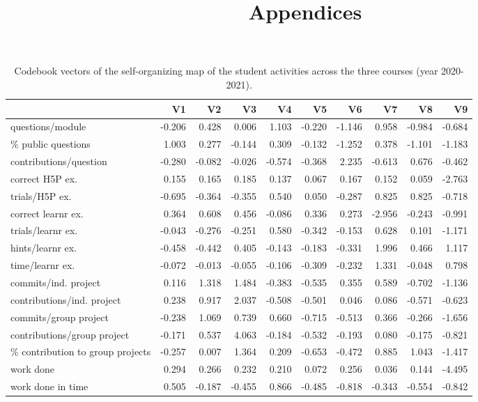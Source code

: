 \documentclass[
]{article}
\title{Appendices}
\author{}
\date{\vspace{-2.5em}}
\begin{document}
\maketitle

\begin{landscape}\begin{table}

\caption{\label{tab:somtab1}\label{tab:tab_som} Codebook vectors of the self-organizing map of the student activities across the three courses (year 2020-2021).}
\centering
\begin{tabular}[t]{l|r|r|r|r|r|r|r|r|r}
\hline
  & V1 & V2 & V3 & V4 & V5 & V6 & V7 & V8 & V9\\
\hline
questions/module & -0.206 & 0.428 & 0.006 & 1.103 & -0.220 & -1.146 & 0.958 & -0.984 & -0.684\\
\hline
\% public questions & 1.003 & 0.277 & -0.144 & 0.309 & -0.132 & -1.252 & 0.378 & -1.101 & -1.183\\
\hline
contributions/question & -0.280 & -0.082 & -0.026 & -0.574 & -0.368 & 2.235 & -0.613 & 0.676 & -0.462\\
\hline
correct H5P ex. & 0.155 & 0.165 & 0.185 & 0.137 & 0.067 & 0.167 & 0.152 & 0.059 & -2.763\\
\hline
trials/H5P ex. & -0.695 & -0.364 & -0.355 & 0.540 & 0.050 & -0.287 & 0.825 & 0.825 & -0.718\\
\hline
correct learnr ex. & 0.364 & 0.608 & 0.456 & -0.086 & 0.336 & 0.273 & -2.956 & -0.243 & -0.991\\
\hline
trials/learnr ex. & -0.043 & -0.276 & -0.251 & 0.580 & -0.342 & -0.153 & 0.628 & 0.101 & -1.171\\
\hline
hints/learnr ex. & -0.458 & -0.442 & 0.405 & -0.143 & -0.183 & -0.331 & 1.996 & 0.466 & 1.117\\
\hline
time/learnr ex. & -0.072 & -0.013 & -0.055 & -0.106 & -0.309 & -0.232 & 1.331 & -0.048 & 0.798\\
\hline
commits/ind. project & 0.116 & 1.318 & 1.484 & -0.383 & -0.535 & 0.355 & 0.589 & -0.702 & -1.136\\
\hline
contributions/ind. project & 0.238 & 0.917 & 2.037 & -0.508 & -0.501 & 0.046 & 0.086 & -0.571 & -0.623\\
\hline
commits/group project & -0.238 & 1.069 & 0.739 & 0.660 & -0.715 & -0.513 & 0.366 & -0.266 & -1.656\\
\hline
contributions/group project & -0.171 & 0.537 & 4.063 & -0.184 & -0.532 & -0.193 & 0.080 & -0.175 & -0.821\\
\hline
\% contribution to group projects & -0.257 & 0.007 & 1.364 & 0.209 & -0.653 & -0.472 & 0.885 & 1.043 & -1.417\\
\hline
work done & 0.294 & 0.266 & 0.232 & 0.210 & 0.072 & 0.256 & 0.036 & 0.144 & -4.495\\
\hline
work done in time & 0.505 & -0.187 & -0.455 & 0.866 & -0.485 & -0.818 & -0.343 & -0.554 & -0.842\\
\hline
\end{tabular}
\end{table}
\end{landscape}
\end{document}
